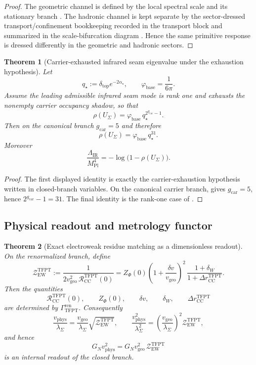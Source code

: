 \documentclass[11pt,a4paper]{article}
\newtheorem{theorem}{Theorem}[section]
\theoremstyle{definition}
\theoremstyle{remark}
\newcommand{\Mplunred}{M_{\mathrm{Pl}}}
\newcommand{\phibase}{\varphi_{\mathrm{base}}}
\newcommand{\deltatop}{\delta_{\mathrm{top}}}
\newcommand{\gcar}{g_{\mathrm{car}}}
\newcommand{\vgeo}{v_{\mathrm{geo}}}
\begin{document}
\begin{proof}
The geometric channel is defined by the local spectral scale and its stationary branch
. The hadronic channel is
kept separate by the sector-dressed transport/confinement bookkeeping recorded in the transport
block and summarized in the scale-bifurcation diagram . Hence the
same primitive response is dressed differently in the geometric and hadronic sectors.
\end{proof}

\begin{theorem}[Carrier-exhausted infrared seam eigenvalue under the exhaustion hypothesis]
\label{thm:carrier-exhausted-ir-seam-eigenvalue}
Let
\[
q_\star:=\deltatop e^{-2\alpha_\star},
\qquad
\phibase=\frac{1}{6\pi}.
\]
Assume the leading admissible infrared seam mode is rank one and exhausts the nonempty carrier
occupancy shadow, so that
\[
\rho(U_\Sigma)=\phibase\,q_\star^{2^{\gcar}-1}.
\]
Then on the canonical branch $\gcar=5$ and therefore
\[
\rho(U_\Sigma)=\phibase\,q_\star^{31}.
\]
Moreover
\[
\frac{\Lambda_{\mathrm{IR}}}{\Mplunred^4}
=
-\log\!\bigl(1-\rho(U_\Sigma)\bigr).
\]
\end{theorem}

\begin{proof}
The first displayed identity is exactly the carrier-exhaustion hypothesis written in closed-branch
variables. On the canonical carrier branch,  gives
$\gcar=5$, hence $2^{\gcar}-1=31$. The final identity is the rank-one case of
.
\end{proof}

\subsection{Physical readout and metrology functor}

\begin{theorem}[Exact electroweak residue matching as a dimensionless readout]
\label{thm:dimensionless-ew-residue-matching}
On the renormalized branch, define
\[
\mathcal Z_{\mathrm{EW}}^{\mathrm{TFPT}}
:=
\frac{1}{2\vgeo^2\,\mathcal R_{\mathrm{CC}}^{\mathrm{TFPT}}(0)}
=
Z_\Phi(0)\left(1+\frac{\delta v}{\vgeo}\right)^2
\,\frac{1+\delta_W}{1+\Delta r_{\mathrm{CC}}^{\mathrm{TFPT}}}.
\]
Then the quantities
\[
\mathcal R_{\mathrm{CC}}^{\mathrm{TFPT}}(0),
\qquad
Z_\Phi(0),
\qquad
\delta v,
\qquad
\delta_W,
\qquad
\Delta r_{\mathrm{CC}}^{\mathrm{TFPT}}
\]
are determined by $\Gamma_{\mathrm{TFPT}}^{\mathrm{ren}}$. Consequently
\[
\frac{v_{\mathrm{phys}}}{\lambda_\Sigma}
=
\frac{\vgeo}{\lambda_\Sigma}\sqrt{\mathcal Z_{\mathrm{EW}}^{\mathrm{TFPT}}},
\qquad
\frac{v_{\mathrm{phys}}^2}{\lambda_\Sigma^2}
=
\left(\frac{\vgeo}{\lambda_\Sigma}\right)^2\mathcal Z_{\mathrm{EW}}^{\mathrm{TFPT}},
\]
and hence
\[
G_Nv_{\mathrm{phys}}^2
=
G_N\vgeo^2\,\mathcal Z_{\mathrm{EW}}^{\mathrm{TFPT}}
\]
is an internal readout of the closed branch.
\end{theorem}
\end{document}
